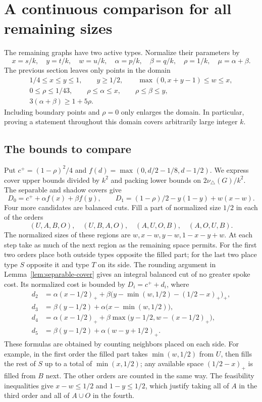 \documentclass[11pt]{article}
\newcommand{\tp}{\nu_{\triangle}}
\begin{document}
\section{A continuous comparison for all remaining sizes}\label{sec:interval}
The remaining graphs have two active types. Normalize their parameters by
\[
 x=s/k,\quad y=t/k,\quad w=u/k,\quad
 \alpha=p/k,\quad\beta=q/k,\quad\rho=1/k,\quad\mu=\alpha+\beta.
\]
The previous section leaves only points in the domain
\begin{equation}\label{eq:domain}
\begin{gathered}
1/4\leq x\leq y\leq1,\qquad y\geq1/2,\qquad
\max(0,x+y-1)\leq w\leq x,\\
0\leq\rho\leq1/43,\qquad
\rho\leq\alpha\leq x,\qquad\rho\leq\beta\leq y,\\
3(\alpha+\beta)\geq1+5\rho.
\end{gathered}
\end{equation}
Including boundary points and $\rho=0$ only enlarges the domain. In
particular, proving a statement throughout this domain covers arbitrarily
large integer $k$.

\subsection{The bounds to compare}
Put $c^+=(1-\rho)^2/4$ and $f(d)=\max(0,d/2-1/8,d-1/2)$.
We express cover upper bounds divided by $k^2$ and packing lower bounds
on $2\tp(G)/k^2$. The separable and shadow covers give
\[
 D_0=c^++\alpha f(x)+\beta f(y),\qquad
 D_1=(1-\rho)/2-y(1-y)+w(x-w).
\]
Four more candidates are balanced cuts. Fill a part of normalized size
$1/2$ in each of the orders
\[
 (U,A,B,O),\quad(U,B,A,O),\quad(A,U,O,B),\quad(A,O,U,B).
\]
The normalized sizes of these regions are $w,x-w,y-w,1-x-y+w$.
At each step take as much of the next region as the remaining space
permits. For the first two orders place both outside types opposite
the filled part; for the last two place type $S$ opposite it and type
$T$ on its side. The rounding argument in
Lemma~\ref{lem:separable-cover} gives an integral balanced cut of no
greater spoke cost. Its normalized cost is bounded by $D_i=c^++d_i$,
where
\begin{align*}
 d_2&=\alpha(x-1/2)_+
 +\beta\bigl(y-\min(w,1/2)-(1/2-x)_+\bigr)_+,\\
 d_3&=\beta(y-1/2)+\alpha\bigl(x-\min(w,1/2)\bigr),\\
 d_4&=\alpha(x-1/2)_+
 +\beta\max\bigl(y-1/2,w-(x-1/2)_+\bigr),\\
 d_5&=\beta(y-1/2)+\alpha(w-y+1/2)_+.
\end{align*}
These formulas are obtained by counting neighbors placed on each side.
For example, in the first order the filled part takes $\min(w,1/2)$
from $U$, then fills the rest of $S$ up to a total of $\min(x,1/2)$;
any available space $(1/2-x)_+$ is filled from $B$ next. The other
orders are counted in the same way. The feasibility inequalities give
$x-w\leq1/2$ and $1-y\leq1/2$, which justify taking all of $A$ in
the third order and all of $A\cup O$ in the fourth.
\end{document}
